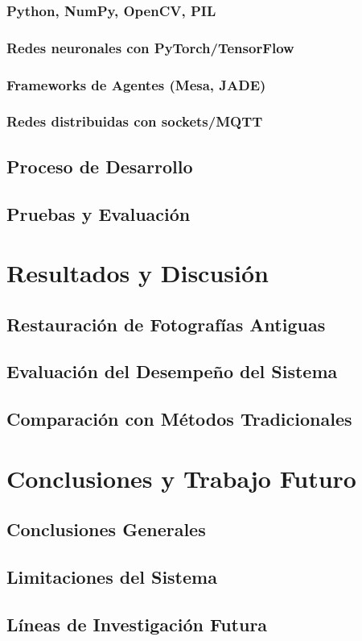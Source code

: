 \documentclass{article}
\begin{document}
\subsubsection{Python, NumPy, OpenCV, PIL}
\subsubsection{Redes neuronales con PyTorch/TensorFlow}
\subsubsection{Frameworks de Agentes (Mesa, JADE)}
\subsubsection{Redes distribuidas con sockets/MQTT}
\subsection{Proceso de Desarrollo}
\subsection{Pruebas y Evaluación}

\section{Resultados y Discusión}
\subsection{Restauración de Fotografías Antiguas}
\subsection{Evaluación del Desempeño del Sistema}
\subsection{Comparación con Métodos Tradicionales}

\section{Conclusiones y Trabajo Futuro}
\subsection{Conclusiones Generales}
\subsection{Limitaciones del Sistema}
\subsection{Líneas de Investigación Futura}
\end{document}
